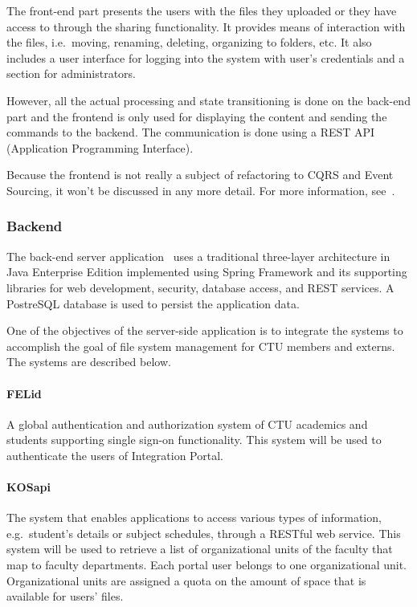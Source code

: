 \documentclass{book}
\begin{document}
The front-end part presents the users with the files they uploaded or
they have access to through the sharing functionality. It provides means
of interaction with the files, i.e.~moving, renaming, deleting,
organizing to folders, etc. It also includes a user interface for
logging into the system with user's credentials and a section for
administrators.

However, all the actual processing and state transitioning is done on
the back-end part and the frontend is only used for displaying the
content and sending the commands to the backend. The communication is
done using a REST API (Application Programming Interface).

Because the frontend is not really a subject of refactoring to CQRS and
Event Sourcing, it won't be discussed in any more detail. For more
information, see~\cite{ddd}.

\subsubsection{Backend}\label{backend}

The back-end server application~\cite{backend} uses a traditional
three-layer architecture in Java Enterprise Edition implemented using
Spring Framework and its supporting libraries for web development,
security, database access, and REST services. A PostreSQL database is
used to persist the application data.

One of the objectives of the server-side application is to integrate the
systems to accomplish the goal of file system management for CTU members
and externs. The systems are described below.

\paragraph{FELid}\label{felid}

A global authentication and authorization system of CTU academics and
students supporting single sign-on functionality. This system will be
used to authenticate the users of Integration Portal.

\paragraph{KOSapi}\label{kosapi}

The system that enables applications to access various types of
information, e.g.~student's details or subject schedules, through a
RESTful web service. This system will be used to retrieve a list of
organizational units of the faculty that map to faculty departments.
Each portal user belongs to one organizational unit. Organizational
units are assigned a quota on the amount of space that is available for
users' files.
\end{document}
